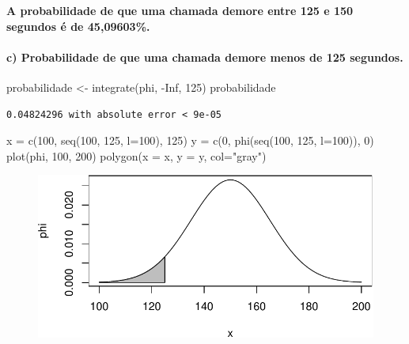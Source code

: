 \documentclass[
  letterpaper,
  DIV=11,
  numbers=noendperiod]{scrartcl}
\let\oldparagraph\paragraph
\renewcommand{\paragraph}[1]{\oldparagraph{#1}\mbox{}}
\newenvironment{Shaded}{\begin{snugshade}}{\end{snugshade}}
\newcommand{\AttributeTok}[1]{\textcolor[rgb]{0.40,0.45,0.13}{#1}}
\newcommand{\ConstantTok}[1]{\textcolor[rgb]{0.56,0.35,0.01}{#1}}
\newcommand{\DecValTok}[1]{\textcolor[rgb]{0.68,0.00,0.00}{#1}}
\newcommand{\FunctionTok}[1]{\textcolor[rgb]{0.28,0.35,0.67}{#1}}
\newcommand{\NormalTok}[1]{\textcolor[rgb]{0.00,0.23,0.31}{#1}}
\newcommand{\OtherTok}[1]{\textcolor[rgb]{0.00,0.23,0.31}{#1}}
\newcommand{\SpecialCharTok}[1]{\textcolor[rgb]{0.37,0.37,0.37}{#1}}
\newcommand{\StringTok}[1]{\textcolor[rgb]{0.13,0.47,0.30}{#1}}
\begin{document}
\textbf{A probabilidade de que uma chamada demore entre 125 e 150
segundos é de 45,09603\%.}

\hypertarget{c-probabilidade-de-que-uma-chamada-demore-menos-de-125-segundos.}{%
\paragraph{c) Probabilidade de que uma chamada demore menos de 125
segundos.}\label{c-probabilidade-de-que-uma-chamada-demore-menos-de-125-segundos.}}

\begin{Shaded}
\begin{Highlighting}[]
\NormalTok{probabilidade }\OtherTok{\textless{}{-}} \FunctionTok{integrate}\NormalTok{(phi, }\SpecialCharTok{{-}}\ConstantTok{Inf}\NormalTok{, }\DecValTok{125}\NormalTok{)}
\NormalTok{probabilidade}
\end{Highlighting}
\end{Shaded}

\begin{verbatim}
0.04824296 with absolute error < 9e-05
\end{verbatim}

\begin{Shaded}
\begin{Highlighting}[]
\NormalTok{x }\OtherTok{=} \FunctionTok{c}\NormalTok{(}\DecValTok{100}\NormalTok{, }\FunctionTok{seq}\NormalTok{(}\DecValTok{100}\NormalTok{, }\DecValTok{125}\NormalTok{, }\AttributeTok{l=}\DecValTok{100}\NormalTok{), }\DecValTok{125}\NormalTok{)}
\NormalTok{y }\OtherTok{=} \FunctionTok{c}\NormalTok{(}\DecValTok{0}\NormalTok{, }\FunctionTok{phi}\NormalTok{(}\FunctionTok{seq}\NormalTok{(}\DecValTok{100}\NormalTok{, }\DecValTok{125}\NormalTok{, }\AttributeTok{l=}\DecValTok{100}\NormalTok{)), }\DecValTok{0}\NormalTok{)}
\FunctionTok{plot}\NormalTok{(phi, }\DecValTok{100}\NormalTok{, }\DecValTok{200}\NormalTok{)}
\FunctionTok{polygon}\NormalTok{(}\AttributeTok{x =}\NormalTok{ x, }\AttributeTok{y =}\NormalTok{ y, }\AttributeTok{col=}\StringTok{"gray"}\NormalTok{)}
\end{Highlighting}
\end{Shaded}

\begin{figure}[H]

{\centering \includegraphics{quiz5_files/figure-pdf/unnamed-chunk-7-1.pdf}

}

\end{figure}
\end{document}

